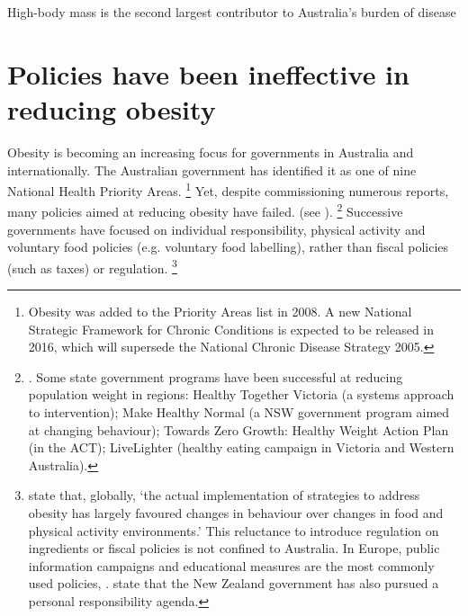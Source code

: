 \documentclass[embargoed]{grattan}
\begin{document}
\begin{table}
\caption{High-body mass is the second largest contributor to Australia's burden of disease} \label{tbl:high-body-is-the-2nd-largest-contributor-to-Aust-disease-burden}




\end{table}

\section{Policies have been ineffective in reducing obesity}\label{policies-have-been-ineffective-in-reducing-obesity}

Obesity is becoming an increasing focus for governments in Australia and internationally.
The Australian government has identified it as one of nine National Health Priority Areas.%
\footnote{Obesity was added to the Priority Areas list in 2008.
A new National Strategic Framework for Chronic Conditions is expected to be released in 2016, which will supersede the National Chronic Disease Strategy 2005.} Yet, despite commissioning numerous reports, many policies aimed at reducing obesity have failed. (see ).%
\footnote{\textcite{Swinburn2013Progressobesityprevention}.
Some state government programs have been successful at reducing population weight in regions: Healthy Together Victoria (a systems approach to intervention); Make Healthy Normal (a NSW government program aimed at changing behaviour); Towards Zero Growth: Healthy Weight Action Plan (in the ACT); LiveLighter (healthy eating campaign in Victoria and Western Australia).} Successive governments have focused on individual responsibility, physical activity and voluntary food policies (e.g. voluntary food labelling), rather than fiscal policies (such as taxes) or regulation.%
\footnote{\textcite{Roberto2015Patchyprogressobesity} state that, globally, `the actual implementation of strategies to address obesity has largely favoured changes in behaviour over changes in food and physical activity environments.' This reluctance to introduce regulation on ingredients or fiscal policies is not confined to Australia.
In Europe, public information campaigns and educational measures are the most commonly used policies, \textcite{Capacci2012Policiespromotehealthy}. \textcite{Swinburn2013Progressobesityprevention} state that the New Zealand government has also pursued a personal responsibility agenda.}
\end{document}
